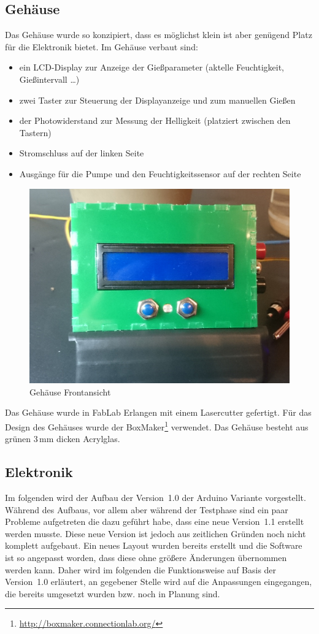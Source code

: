 	
	
\subsection{Gehäuse}
	Das Gehäuse wurde so konzipiert, dass es möglichst klein ist aber genügend Platz für die Elektronik bietet.
	Im Gehäuse verbaut sind:
\begin{itemize}
	\item ein LCD-Display zur Anzeige der Gießparameter (aktelle Feuchtigkeit, Gießintervall \dots)
	\item zwei Taster zur Steuerung der Displayanzeige und zum manuellen Gießen
	\item der Photowiderstand zur Messung der Helligkeit (platziert zwischen den Tastern)
	\item Stromschluss auf der linken Seite
	\item Ausgänge für die Pumpe und den Feuchtigkeitssensor auf der rechten Seite

\end{itemize}	

	\begin{figure}[!h]
	\includegraphics[width=0.8\linewidth]{bilder/_boxFron1.jpg}	
	\caption{Gehäuse Frontansicht}
	\label{fig-Gehäuse}
	\end{figure}
	
Das Gehäuse wurde in FabLab Erlangen mit einem Lasercutter gefertigt. 
Für das Design des Gehäuses wurde der BoxMaker\footnote{ \href{http://boxmaker.connectionlab.org/}{http://boxmaker.connectionlab.org/}} verwendet. 
Das Gehäuse besteht aus grünen 3\,mm dicken Acrylglas.
	
\subsection{Elektronik}
Im folgenden wird der Aufbau der Version~1.0 der Arduino Variante vorgestellt. 
Während des Aufbaus, vor allem aber während der Testphase sind ein paar Probleme aufgetreten die dazu geführt habe, dass eine neue Version~1.1 erstellt werden musste. 
Diese neue Version ist jedoch aus zeitlichen Gründen noch nicht komplett aufgebaut. 
Ein neues Layout wurden bereits erstellt und die Software ist so angepasst worden, dass diese ohne größere Änderungen übernommen werden kann. 
Daher wird im folgenden die Funktionsweise auf Basis der Version~1.0 erläutert, an gegebener Stelle wird auf die Anpassungen eingegangen, die bereits umgesetzt wurden bzw. noch in Planung sind. 

